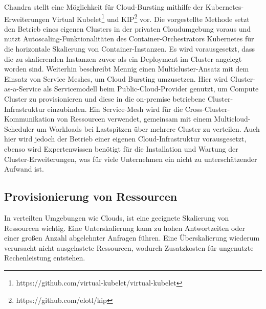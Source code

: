 \documentclass[runningheads]{llncs}
\begin{document}
Chandra \cite{chandra_cloud_2020} stellt eine Möglichkeit für Cloud-Bursting mithilfe der Kubernetes-Erweiterungen Virtual Kubelet\footnote{https://github.com/virtual-kubelet/virtual-kubelet} und KIP\footnote{https://github.com/elotl/kip} vor. Die vorgestellte Methode setzt den Betrieb eines eigenen Clusters in der privaten Cloudumgebung voraus und nutzt Autoscaling-Funktionalitäten des Container-Orchestrators Kubernetes für die horizontale Skalierung von Container-Instanzen. Es wird vorausgesetzt, dass die zu skalierenden Instanzen zuvor als ein Deployment im Cluster angelegt worden sind. Weiterhin beschreibt Mennig \cite{mennig_cloud_2020} einen Multicluster-Ansatz mit dem Einsatz von Service Meshes, um Cloud Bursting umzusetzen. Hier wird Cluster-as-a-Service als Servicemodell beim Public-Cloud-Provider genutzt, um Compute Cluster zu provisionieren und diese in die on-premise betriebene Cluster-Infrastruktur einzubinden. Ein Service-Mesh wird für die Cross-Cluster-Kommu\-nikation von Ressourcen verwendet, gemeinsam mit einem Multicloud-Scheduler um Workloads bei Lastspitzen über mehrere Cluster zu verteilen. Auch hier wird jedoch der Betrieb einer eigenen Cloud-Infrastruktur vorausgesetzt, ebenso wird Expertenwissen benötigt für die Installation und Wartung der Cluster-Erweiterungen, was für viele Unternehmen ein nicht zu unterschätzender Aufwand ist.
	
\subsection{Provisionierung von Ressourcen}

In verteilten Umgebungen wie Clouds, ist eine geeignete Skalierung von Ressourcen wichtig. Eine Unterskalierung kann zu hohen Antwortzeiten oder einer großen Anzahl abgelehnter Anfragen führen.  Eine Überskalierung wiederum verursacht nicht ausgelastete Ressourcen, wodurch Zusatzkosten für ungenutzte Rechenleistung entstehen. \\
\end{document}
